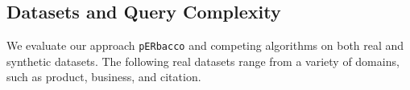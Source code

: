 \documentclass[sigconf, nonacm]{acmart}
\newcommand{\perbacco}{\texttt{pERbacco}\xspace}
\newcommand{\cora}{\texttt{Cora}\xspace}
\newcommand{\camera}{\texttt{Camera}\xspace}
\newcommand{\funding}{\texttt{Funding}\xspace}
\newcommand{\voters}{\texttt{Voters}\xspace}
\newcommand{\wdc}{\texttt{WDC-80}\xspace}
\newcommand{\blue}[1]{\textcolor{blue}{#1}}
\begin{document}
\subsection{Datasets and Query Complexity}\label{sub:datasets}
We evaluate our approach \perbacco and competing algorithms on both real and synthetic datasets. The following real datasets range from a variety of domains, such as product, business, and citation.

\end{document}

